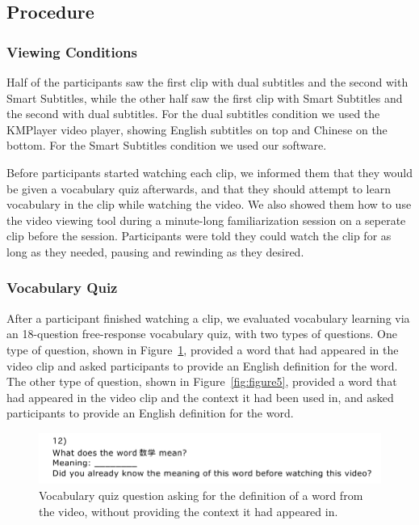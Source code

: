 \documentclass{sigchi}
\begin{document}
\subsection{Procedure}

\subsubsection{Viewing Conditions}

Half of the participants saw the first clip with dual
subtitles and the second with Smart Subtitles, while the
other half saw the first clip with Smart Subtitles and
the second with dual subtitles.
For the dual subtitles
condition we used the KMPlayer video player, showing English subtitles
on top and Chinese on the bottom. For the Smart
Subtitles condition we used our software.

Before participants started watching each clip, we
informed them that they would be given a vocabulary
quiz afterwards, and that they should attempt to learn vocabulary
in the clip while watching the video. We also
showed them how to use the video viewing tool
during a minute-long familiarization session on a seperate clip
before the session. Participants were told 
they could watch the clip for as long as they
needed, pausing and rewinding as they desired.

\subsubsection{Vocabulary Quiz}

After a participant finished watching a clip, we evaluated vocabulary learning via an 18-question free-response vocabulary quiz, with two types of questions. One type of question, shown in Figure~\ref{fig:figure4}, provided a word that had appeared in the video clip and asked participants to provide an English definition for the word. The other type of question, shown in Figure~\ref{fig:figure5}, provided a word that had appeared in the video clip and the context it had been used in, and asked participants to provide an English definition for the word.

\begin{figure}[!h]
\centering
\includegraphics[width=\columnwidth]{vocab-quiz-1}
\caption{Vocabulary quiz question asking for the definition
of a word from the video, without providing the context it had appeared in.}
\label{fig:figure4}
\end{figure}
\end{document}
